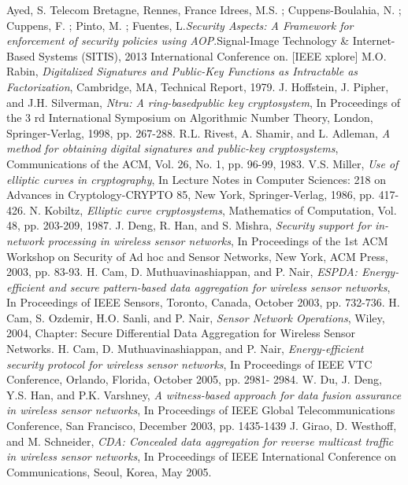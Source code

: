 \documentclass[12pt,a4paper,twoside]{report}
\begin{document}
\begin{thebibliography}{01}
 Ayed, S. Telecom Bretagne, Rennes, France Idrees, M.S. ; Cuppens-Boulahia, N. ; Cuppens, F. ; Pinto, M. ; Fuentes, L.\emph{Security Aspects: A Framework for enforcement of security policies using AOP}.Signal-Image Technology \& Internet-Based Systems (SITIS), 2013 International Conference on. [IEEE xplore]
 M.O. Rabin, \emph{Digitalized Signatures and Public-Key Functions as Intractable as Factorization}, Cambridge, MA, Technical Report, 1979.
 J. Hoffstein, J. Pipher, and J.H. Silverman, \emph{Ntru: A ring-basedpublic key cryptosystem}, In Proceedings of the 3 rd International Symposium on Algorithmic Number Theory, London, Springer-Verlag, 1998, pp. 267-288.
 R.L. Rivest, A. Shamir, and L. Adleman, \emph{A method for obtaining digital signatures and public-key cryptosystems}, Communications of the ACM, Vol. 26, No. 1, pp. 96-99, 1983.
 V.S. Miller, \emph{Use of elliptic curves in cryptography}, In Lecture Notes in Computer Sciences: 218 on Advances in Cryptology-CRYPTO 85, New York, Springer-Verlag, 1986, pp. 417-426.
 N. Kobiltz, \emph{Elliptic curve cryptosystems}, Mathematics of Computation, Vol. 48, pp. 203-209, 1987.
 J. Deng, R. Han, and S. Mishra, \emph{Security support for in-network processing in wireless sensor networks}, In Proceedings of the 1st ACM Workshop on Security of Ad hoc and Sensor Networks, New York, ACM Press, 2003, pp. 83-93.
 H. Cam, D. Muthuavinashiappan, and P. Nair, \emph{ESPDA: Energy-efficient and secure pattern-based data aggregation for wireless sensor networks}, In Proceedings of IEEE Sensors, Toronto, Canada, October 2003, pp. 732-736.
 H. Cam, S. Ozdemir, H.O. Sanli, and P. Nair, \emph{Sensor Network Operations}, Wiley, 2004, Chapter: Secure Differential Data Aggregation for Wireless Sensor Networks.
 H. Cam, D. Muthuavinashiappan, and P. Nair, \emph{Energy-efficient security protocol for wireless sensor networks}, In Proceedings of IEEE VTC Conference, Orlando, Florida, October 2005, pp. 2981- 2984.
 W. Du, J. Deng, Y.S. Han, and P.K. Varshney, \emph{A witness-based approach for data fusion assurance in wireless sensor networks}, In Proceedings of IEEE Global Telecommunications Conference, San Francisco, December 2003, pp. 1435-1439
 J. Girao, D. Westhoff, and M. Schneider, \emph{CDA: Concealed data aggregation for reverse multicast traffic in wireless sensor networks}, In Proceedings of IEEE International Conference on  Communications, Seoul, Korea, May 2005.

\end{thebibliography}
\end{document}
